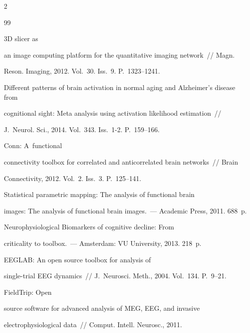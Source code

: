 \begin{multicols}{2}
{{\begin{thebibliography}{99}


   3D slicer as 


an image computing platform for the quantitative imaging network~// Magn. 


Reson. Imaging, 2012. Vol.~30. Iss.~9. P.~1323--1241.






Different patterns of brain activation in normal aging and Alzheimer's disease from 


cognitional sight: Meta analysis using activation likelihood estimation~// 


J.~Neurol. Sci., 2014. Vol.~343. Iss.~1-2. P.~159--166. 




   Conn: A~functional 


connectivity toolbox for correlated and anticorrelated brain networks~// Brain 


Connectivity, 2012. Vol.~2. Iss.~3. P.~125--141. 




   Statistical parametric mapping: The analysis of functional brain 


images: The analysis of functional brain images.~--- Academic Press, 2011. 688~p.




   Neurophysiological Biomarkers of cognitive decline: From 


criticality to toolbox.~--- Amsterdam: VU University, 2013. 218~p.




   EEGLAB: An open source toolbox for analysis of 


single-trial EEG dynamics~// J.~Neurosci. Meth., 2004. Vol.~134. P.~9--21.




   FieldTrip: Open 


source software for advanced analysis of MEG, EEG, and invasive 


electrophysiological data~// Comput. Intell. Neurosc., 2011. 



\end{thebibliography}}}
\end{multicols}
